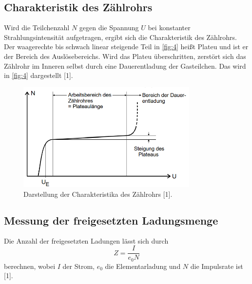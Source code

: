 \subsection{Charakteristik des Zählrohrs}
Wird die Teilchenzahl $N$ gegen die Spannung $U$ bei konstanter Strahlungsintensität aufgetragen, ergibt sich die Charakteristik des Zählrohrs. Der waagerechte bis schwach linear steigende Teil in \autoref{fig:4} heißt Plateu und ist er der Bereich des Auslösebereichs. Wird das Plateu überschritten, zerstört sich das Zählrohr im Inneren selbst durch eine Dauerentladung der Gasteilchen.  Das wird in \autoref{fig:4} dargestellt [1].
\begin{figure}[H] 
  \centering 
  \includegraphics[width=9cm]{content/4} 
  \caption{Darstellung der Charakteristika des Zählrohrs [1].} 
  \label{fig:4} 
\end{figure}

\subsection{Messung der freigesetzten Ladungsmenge}
Die Anzahl der freigesetzten Ladungen lässt sich durch 
\begin{equation}
  Z=\frac{I}{e_0 N}
  \label{eq:5}
\end{equation}
berechnen, wobei $I$ der Strom, $e_0$ die Elementarladung und $N$ die Impulsrate ist [1]. 
